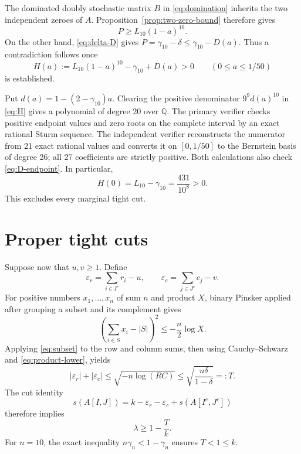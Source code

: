 \documentclass[11pt]{article}
\theoremstyle{remark}
\newcommand{\QQ}{\mathbb Q}
\begin{document}
The dominated doubly stochastic matrix $B$ in \eqref{eq:domination} inherits
the two independent zeroes of $A$.  Proposition~\ref{prop:two-zero-bound}
therefore gives
\begin{equation}\label{eq:marginal-permanent}
 P\ge L_{10}(1-a)^{10}.
\end{equation}
On the other hand, \eqref{eq:delta-D} gives
$P=\gamma_{10}-\delta\le\gamma_{10}-D(a)$.  Thus a contradiction follows
once
\begin{equation}\label{eq:H}
 H(a):=L_{10}(1-a)^{10}-\gamma_{10}+D(a)>0
 \qquad(0\le a\le1/50)
\end{equation}
is established.

Put $d(a)=1-(2-\gamma_{10})a$.  Clearing the positive denominator
$9^9d(a)^{10}$ in \eqref{eq:H} gives a polynomial of degree 20 over $\QQ$.
The primary verifier checks positive endpoint values and zero roots on the
complete interval by an exact rational Sturm sequence.  The independent
verifier reconstructs the numerator from 21 exact rational values and
converts it on $[0,1/50]$ to the Bernstein basis of degree 26; all 27
coefficients are strictly positive.  Both calculations also check
\eqref{eq:D-endpoint}.  In particular,
\[
 H(0)=L_{10}-\gamma_{10}=\frac{431}{10^8}>0.
\]
This excludes every marginal tight cut.

\section{Proper tight cuts}

Suppose now that $u,v\ge1$.  Define
\[
 \varepsilon_r=\sum_{i\in I^c}r_i-u,
 \qquad
 \varepsilon_c=\sum_{j\in J^c}c_j-v.
\]
For positive numbers $x_1,\dots,x_n$ of sum $n$ and product $X$, binary
Pinsker applied after grouping a subset and its complement gives
\begin{equation}\label{eq:subset}
 \left(\sum_{i\in S}x_i-|S|\right)^2
 \le-\frac n2\log X.
\end{equation}
Applying \eqref{eq:subset} to the row and column sums, then using
Cauchy--Schwarz and \eqref{eq:product-lower}, yields
\begin{equation}\label{eq:T}
 |\varepsilon_r|+|\varepsilon_c|
 \le\sqrt{-n\log(RC)}
 \le\sqrt{\frac{n\delta}{1-\delta}}=:T.
\end{equation}
The cut identity
\[
 s(A[I,J])=k-\varepsilon_r-\varepsilon_c+s(A[I^c,J^c])
\]
therefore implies
\begin{equation}\label{eq:lambda-proper}
 \lambda\ge1-\frac Tk.
\end{equation}
For $n=10$, the exact inequality $n\gamma_n<1-\gamma_n$ ensures $T<1\le k$.
\end{document}
